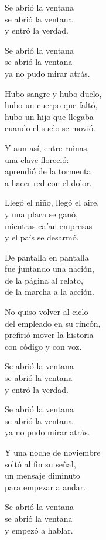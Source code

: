 \begin{lyrics}
Se abrió la ventana\\
se abrió la ventana\\
y entró la verdad.

Se abrió la ventana\\
se abrió la ventana\\
ya no pudo mirar atrás.

Hubo sangre y hubo duelo,\\
hubo un cuerpo que faltó,\\
hubo un hijo que llegaba\\
cuando el suelo se movió.

Y aun así, entre ruinas,\\
una clave floreció:\\
aprendió de la tormenta\\
a hacer red con el dolor.

Llegó el niño, llegó el aire,\\
y una placa se ganó,\\
mientras caían empresas\\
y el país se desarmó.

De pantalla en pantalla\\
fue juntando una nación,\\
de la página al relato,\\
de la marcha a la acción.

No quiso volver al ciclo\\
del empleado en su rincón,\\
prefirió mover la historia\\
con código y con voz.

Se abrió la ventana\\
se abrió la ventana\\
y entró la verdad.

Se abrió la ventana\\
se abrió la ventana\\
ya no pudo mirar atrás.

Y una noche de noviembre\\
soltó al fin su señal,\\
un mensaje diminuto\\
para empezar a andar.

Se abrió la ventana\\
se abrió la ventana\\
y empezó a hablar.
\end{lyrics}

